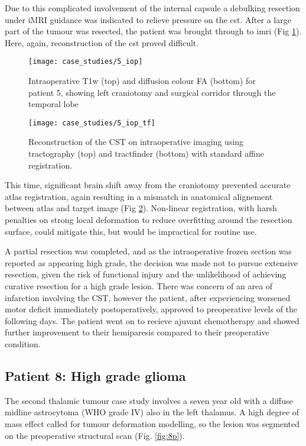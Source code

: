 Due to this complicated involvement of the internal capsule a debulking resection under iMRI guidance was indicated to relieve pressure on the \gls{cst}.
After a large part of the tumour was resected, the patient was brought through to \gls{imri} (Fig \ref{fig:5i}).
Here, again, reconstruction of the \gls{cst} proved difficult.

\begin{figure}
  \centering
  \texttt{[image: case\_studies/5\_iop]}
  \caption{Intraoperative T1w (top) and diffusion colour FA (bottom) for patient 5, showing left craniotomy and surgical corridor through the temporal lobe}
  \label{fig:5i}
\end{figure}

\begin{figure}
  \centering
  \texttt{[image: case\_studies/5\_iop\_tf]}
  \caption{Reconstruction of the CST on intraoperative imaging using tractography (top) and tractfinder (bottom) with standard affine registration.}
  \label{fig:5i_cst}
\end{figure}

This time, significant brain shift away from the craniotomy prevented accurate atlas registration, again resulting in a mismatch in anatomical alignement between atlas and target image (Fig \ref{fig:5i_cst}).
Non-linear registration, with harsh penalties on strong local deformation to reduce overfitting around the resection surface, could mitigate this, but would be impractical for routine use.

A partial resection was completed, and as the intraoperative frozen section  was reported as appearing high grade, the decision was made not to pursue extensive resection, given the risk of functional injury and the unlikelihood of achieving curative resection for a high grade lesion. 
There was concern of an area of infarction involving the CST, however the patient, after experiencing worsened motor deficit immediately postoperatively, approved to preoperative levels of the following days.
The patient went on to recieve ajuvant chemotherapy and showed further improvement to their hemiparesis compared to their preoperative condition.

\subsection{Patient 8: High grade glioma}

The second thalamic tumour case study involves a seven year old with a diffuse midline astrocytoma (WHO grade IV) also in the left thalamus.
A high degree of mass effect called for tumour deformation modelling, so the lesion was segmented on the preoperative structural scan (Fig. \ref{fig:8p}).

